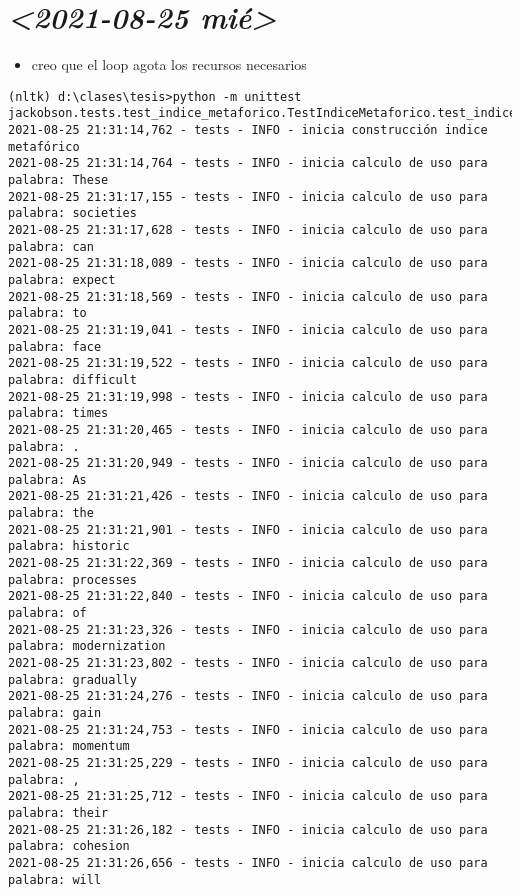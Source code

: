 \documentclass[11pt]{article}
\begin{document}
\section{\textit{<2021-08-25 mié>}}
\label{sec:orge75eb7b}

\begin{itemize}
\item creo que el loop agota los recursos necesarios
\end{itemize}

\begin{verbatim}
(nltk) d:\clases\tesis>python -m unittest jackobson.tests.test_indice_metaforico.TestIndiceMetaforico.test_indice_metaforico
2021-08-25 21:31:14,762 - tests - INFO - inicia construcción indice metafórico
2021-08-25 21:31:14,764 - tests - INFO - inicia calculo de uso para palabra: These
2021-08-25 21:31:17,155 - tests - INFO - inicia calculo de uso para palabra: societies
2021-08-25 21:31:17,628 - tests - INFO - inicia calculo de uso para palabra: can
2021-08-25 21:31:18,089 - tests - INFO - inicia calculo de uso para palabra: expect
2021-08-25 21:31:18,569 - tests - INFO - inicia calculo de uso para palabra: to
2021-08-25 21:31:19,041 - tests - INFO - inicia calculo de uso para palabra: face
2021-08-25 21:31:19,522 - tests - INFO - inicia calculo de uso para palabra: difficult
2021-08-25 21:31:19,998 - tests - INFO - inicia calculo de uso para palabra: times
2021-08-25 21:31:20,465 - tests - INFO - inicia calculo de uso para palabra: .
2021-08-25 21:31:20,949 - tests - INFO - inicia calculo de uso para palabra: As
2021-08-25 21:31:21,426 - tests - INFO - inicia calculo de uso para palabra: the
2021-08-25 21:31:21,901 - tests - INFO - inicia calculo de uso para palabra: historic
2021-08-25 21:31:22,369 - tests - INFO - inicia calculo de uso para palabra: processes
2021-08-25 21:31:22,840 - tests - INFO - inicia calculo de uso para palabra: of
2021-08-25 21:31:23,326 - tests - INFO - inicia calculo de uso para palabra: modernization
2021-08-25 21:31:23,802 - tests - INFO - inicia calculo de uso para palabra: gradually
2021-08-25 21:31:24,276 - tests - INFO - inicia calculo de uso para palabra: gain
2021-08-25 21:31:24,753 - tests - INFO - inicia calculo de uso para palabra: momentum
2021-08-25 21:31:25,229 - tests - INFO - inicia calculo de uso para palabra: ,
2021-08-25 21:31:25,712 - tests - INFO - inicia calculo de uso para palabra: their
2021-08-25 21:31:26,182 - tests - INFO - inicia calculo de uso para palabra: cohesion
2021-08-25 21:31:26,656 - tests - INFO - inicia calculo de uso para palabra: will

\end{verbatim}
\end{document}

